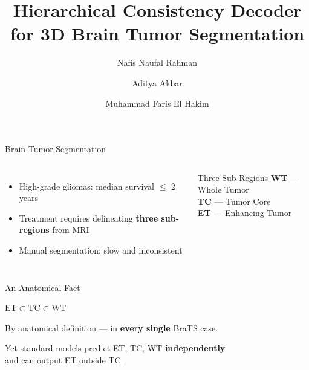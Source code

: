 \documentclass[aspectratio=169]{beamer}
\title[HCD for Brain Tumor Segmentation]{%
  Hierarchical Consistency Decoder\\[0.2em]
  for 3D Brain Tumor Segmentation}
\author{Nafis Naufal Rahman \and Aditya Akbar \and Muhammad Faris El Hakim}
\institute{Dept.\ of Informatics Engineering, Universitas Brawijaya}
\date{}
\begin{document}
\begin{frame}
  \titlepage
\end{frame}

\begin{frame}{Brain Tumor Segmentation}
  \vspace{0.5em}
  \begin{columns}
      \begin{itemize}
        \setlength\itemsep{0.8em}
        \item High-grade gliomas: median survival $\leq$ 2 years
        \item Treatment requires delineating \textbf{three sub-regions} from MRI
        \item Manual segmentation: slow and inconsistent
      \end{itemize}

      \begin{block}{Three Sub-Regions}
        \vspace{0.3em}
        \textbf{WT} — Whole Tumor\\[0.4em]
        \textbf{TC} — Tumor Core\\[0.4em]
        \textbf{ET} — Enhancing Tumor
        \vspace{0.3em}
      \end{block}
  \end{columns}
\end{frame}

\begin{frame}{An Anatomical Fact}
  \vspace{1em}
  \begin{center}
    \Huge $\text{ET} \subset \text{TC} \subset \text{WT}$
  \end{center}

  \vspace{1em}
  \begin{center}
    \large By anatomical definition — in \textbf{every single} BraTS case.
  \end{center}

  \vspace{1.2em}
  \begin{center}
    \textcolor{seorange}{\large
    Yet standard models predict ET, TC, WT \textbf{independently}\\[0.3em]
    and can output ET outside TC.}
  \end{center}
\end{frame}
\end{document}
